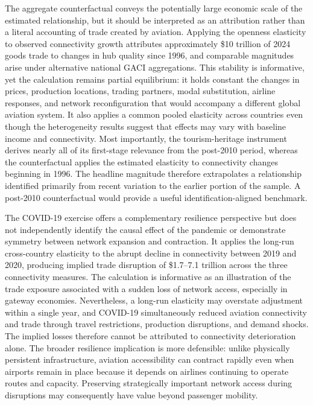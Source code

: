 The aggregate counterfactual conveys the potentially large economic scale of
the estimated relationship, but it should be interpreted as an attribution
rather than a literal accounting of trade created by aviation. Applying the
openness elasticity to observed connectivity growth attributes approximately \$10 trillion of 2024 goods trade to changes in hub quality since 1996, and
comparable magnitudes arise under alternative national GACI aggregations.
This stability is informative, yet the calculation remains partial
equilibrium: it holds constant the changes in prices, production locations,
trading partners, modal substitution, airline responses, and network
reconfiguration that would accompany a different global aviation system. It
also applies a common pooled elasticity across countries even though the
heterogeneity results suggest that effects may vary with baseline income and
connectivity. Most importantly, the tourism-heritage instrument derives
nearly all of its first-stage relevance from the post-2010 period, whereas
the counterfactual applies the estimated elasticity to connectivity changes
beginning in 1996. The headline magnitude therefore extrapolates a
relationship identified primarily from recent variation to the earlier
portion of the sample. A post-2010 counterfactual would provide a useful
identification-aligned benchmark.

The COVID-19 exercise offers a complementary resilience perspective but does
not independently identify the causal effect of the pandemic or demonstrate
symmetry between network expansion and contraction. It applies the long-run
cross-country elasticity to the abrupt decline in connectivity between 2019
and 2020, producing implied trade disruption of \$1.7--7.1 trillion across
the three connectivity measures. The calculation is informative as an illustration of
the trade exposure associated with a sudden loss of network access,
especially in gateway economies. Nevertheless, a long-run elasticity may
overstate adjustment within a single year, and COVID-19 simultaneously
reduced aviation connectivity and trade through travel restrictions,
production disruptions, and demand shocks. The implied losses therefore
cannot be attributed to connectivity deterioration alone. The broader
resilience implication is more defensible: unlike physically persistent
infrastructure, aviation accessibility can contract rapidly even when
airports remain in place because it depends on airlines continuing to operate
routes and capacity. Preserving strategically important network access during
disruptions may consequently have value beyond passenger mobility.

